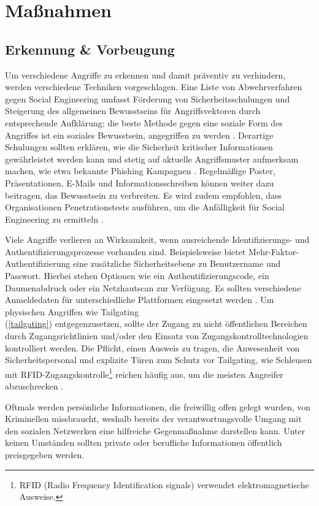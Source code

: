 \chapter{Maßnahmen}
\label{chapter:massnahmen}

\section{Erkennung \& Vorbeugung}

Um verschiedene Angriffe zu erkennen und damit präventiv zu verhindern, werden verschiedene Techniken vorgeschlagen.
Eine Liste von Abwehrverfahren gegen Social Engineering umfasst Förderung von Sicherheitsschulungen und Steigerung des allgemeinen Bewusstseins für Angriffsvektoren durch entsprechende Aufklärung;
die beste Methode gegen eine soziale Form des Angriffes ist ein soziales Bewusstsein, angegriffen zu werden .
Derartige Schulungen sollten erklären, wie die Sicherheit kritischer Informationen gewährleistet werden kann und stetig auf aktuelle Angriffsmuster aufmerksam machen, wie etwa bekannte Phishing Kampagnen .
Regelmäßige Poster, Präsentationen, E-Mails und Informationsschreiben können weiter dazu beitragen, das Bewusstsein zu verbreiten.
Es wird zudem empfohlen, dass Organisationen Penetrationstests ausführen, um die Anfälligkeit für Social Engineering zu ermitteln .

Viele Angriffe verlieren an Wirksamkeit, wenn ausreichende Identifizierungs- und Authentifizierungsprozesse vorhanden sind.
Beispielsweise bietet Mehr-Faktor-Authentifi\-zierung eine zusätzliche Sicherheitsebene zu Benutzername und Passwort.
Hierbei stehen Optionen wie ein Authentifizierungscode, ein Daumenabdruck oder ein Netzhautscan zur Verfügung.
Es sollten verschiedene Anmeldedaten für unterschiedliche Plattformen eingesetzt werden .
Um physischen Angriffen wie Tailgating \\
(\autoref{tailgating}) entgegenzusetzen, sollte der Zugang zu nicht öffentlichen Bereichen durch Zugangsrichtlinien und/oder den Einsatz von Zugangskontrolltechnologien kontrolliert werden.
Die Pflicht, einen Ausweis zu tragen, die Anwesenheit von Sicherheitspersonal und explizite Türen zum Schutz vor Tailgating,
wie Schleusen mit RFID-Zugangskontrolle\footnote{RFID (Radio Frequency Identification signals) verwendet elektromagnetische Ausweise.} reichen häufig aus, um die meisten Angreifer abzuschrecken .

Oftmals werden persönliche Informationen, die freiwillig offen gelegt wurden, von Kriminellen missbraucht, weshalb bereits der verantwortungsvolle Umgang mit den sozialen Netzwerken eine hilfreiche Gegenmaßnahme darstellen kann.
Unter keinen Umständen sollten private oder berufliche Informationen öffentlich preisgegeben werden.

